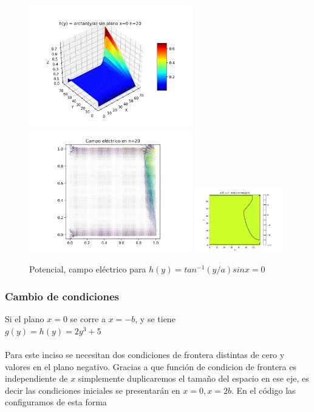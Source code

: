 \documentclass[10pt,journal,compsoc]{IEEEtran}
\begin{document}
\begin{figure}
  \centering
  \includegraphics[width=2.8in]{images/arctan-alt-n20}
  \includegraphics[width=2.8in]{images/arctan-alt-field}
  \includegraphics[width=1.5in]{images/arctan-alt-density}
  \caption{Potencial, campo eléctrico para \(h(y) = tan^{-1}(y/a) sin x=0\)}
  \label{arctan-n20}
\end{figure}


\pagebreak

\subsubsection{Cambio de condiciones}

Si el plano \(x=0\) se corre a \(x=-b\), y se tiene
\\
\(g(y)=h(y)=2y^3+5\) 
\\\\
Para este inciso se necesitan dos condiciones de frontera distintas de cero y valores en el plano negativo.
Gracias a que función de condicion de frontera es independiente de \(x\) simplemente duplicaremos el tamaño del
espacio en ese eje, es decir las condiciones iniciales se presentarán en \(x=0, x=2b\).
En el código las configuramos de esta forma
\end{document}
